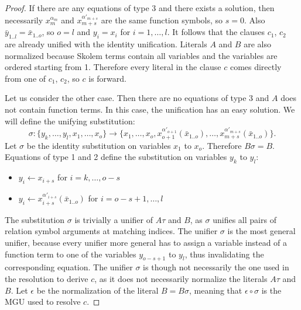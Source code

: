 \documentclass[english, shortabstract]{iithesis}
\theoremstyle{definition} \newtheorem{definition}{Definition}[chapter]
\theoremstyle{remark} \newtheorem{remark}[definition]{Observation}
\theoremstyle{plain} \newtheorem{theorem}[definition]{Theorem}
\theoremstyle{plain} \newtheorem{lemma}[definition]{Lemma}
\newcommand{\subst}[2]{#1 \leftarrow #2}
\begin{document}
\begin{proof}
If there are any equations of type 3 and there exists a solution, then
necessarily $x^{\alpha_m}_m$ and $x^{\alpha'_{m+s}}_{m+s}$ are the same function symbols, so $s=0$.
Also $\bar{y}_{1..l}=\bar{x}_{1..o}$, so $o=l$ and $y_i=x_i$ for $i=1,\dots,l$.
It follows that the clauses $c_1$, $c_2$ are already unified with the identity unification.
Literals $A$ and $B$ are also normalized because Skolem terms contain all variables and the variables are ordered starting from 1.
Therefore every literal in the clause $c$ comes directly from one of $c_1$, $c_2$, so $c$ is forward.

Let us consider the other case. Then there are no equations of type 3 and $A$ does not contain function terms. 
In this case, the unification has an easy solution. 
We will define the unifying substitution: $$\sigma : \{y_k,\dots,y_l, x_1, \dots, x_o\} \rightarrow \{x_1,\dots, x_o, x^{\alpha'_{o+1}}_{o+1}(\bar{x}_{1..o}), \dots, x^{\alpha'_{m+s}}_{m+s}(\bar{x}_{1..o})\}.$$
Let $\sigma$ be the identity substitution on variables $x_1$ to $x_o$. Therefore $B\sigma=B$.
Equations of type 1 and 2 define the substitution on variables $y_k$ to $y_l$:
\begin{itemize}
    \item $\subst{y_i}{x_{i+s}}$ for $i=k,\dots, o-s$
    \item $\subst{y_i}{x^{\alpha'_{i+s}}_{i+s}(\bar{x}_{1..o})}$ for $i=o-s+1,\dots, l$
\end{itemize}
The substitution $\sigma$ is trivially a unifier of $A\tau$ and $B$, as
$\sigma$ unifies all pairs of relation symbol arguments at matching indices.
The unifier $\sigma$ is the most general unifier, because every unifier more general
has to assign a variable instead of a function term to one of the variables $y_{o-s+1}$ to $y_l$, 
thus invalidating the corresponding equation. The unifier $\sigma$ is though not necessarily
the one used in the resolution to derive $c$, as it does not necessarily normalize the literals $A\tau$ and $B$.
Let $\epsilon$ be the normalization of the literal $B=B\sigma$, meaning that $\epsilon\circ\sigma$ is the MGU used to resolve $c$.


\end{proof}
\end{document}

